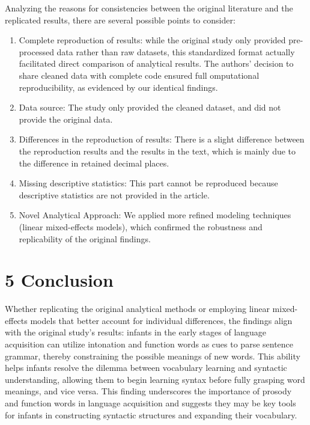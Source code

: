 \documentclass[
  man]{apa6}
\begin{document}
Analyzing the reasons for consistencies between the original literature and the replicated results, there are several possible points to consider:

\begin{enumerate}
\def\labelenumi{(\arabic{enumi})}
\item
  Complete reproduction of results: while the original study only provided pre-processed data rather than raw datasets, this standardized format actually facilitated direct comparison of analytical results. The authors' decision to share cleaned data with complete code ensured full omputational reproducibility, as evidenced by our identical findings.
\item
  Data source: The study only provided the cleaned dataset, and did not provide the original data.
\item
  Differences in the reproduction of results: There is a slight difference between the reproduction results and the results in the text, which is mainly due to the difference in retained decimal places.
\item
  Missing descriptive statistics: This part cannot be reproduced because descriptive statistics are not provided in the article.
\item
  Novel Analytical Approach: We applied more refined modeling techniques (linear mixed-effects models), which confirmed the robustness and replicability of the original findings.
\end{enumerate}

\section{5 Conclusion}\label{conclusion}

Whether replicating the original analytical methods or employing linear mixed-effects models that better account for individual differences, the findings align with the original study's results: infants in the early stages of language acquisition can utilize intonation and function words as cues to parse sentence grammar, thereby constraining the possible meanings of new words. This ability helps infants resolve the dilemma between vocabulary learning and syntactic understanding, allowing them to begin learning syntax before fully grasping word meanings, and vice versa. This finding underscores the importance of prosody and function words in language acquisition and suggests they may be key tools for infants in constructing syntactic structures and expanding their vocabulary.
\end{document}
